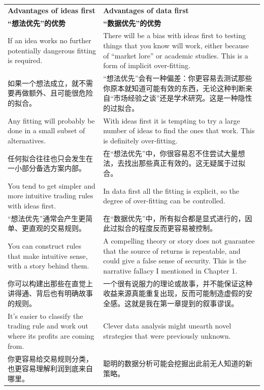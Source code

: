 \begin{bilingualtableblock} \noindent\begin{center} \begin{tabularx}{\textwidth}{@{} Y Y@{}}
\toprule
\textbf{Advantages of ideas first} & \textbf{Advantages of data first} \\
\textbf{“想法优先”的优势} & \textbf{“数据优先”的优势} \\
\midrule
If an idea works no further potentially dangerous fitting is required. &There will be a bias with ideas first to testing things that you know will work, either because of ``market lore'' or academic studies. This is a form of implicit over-fitting. \\
如果一个想法成立，就不需要再做额外、且可能很危险的拟合。 &“想法优先”会有一种偏差：你更容易去测试那些你原本就知道可能有效的东西，无论这种判断来自“市场经验之谈”还是学术研究。这是一种隐性的过拟合。 \\
Any fitting will probably be done in a small subset of alternatives. &With ideas first it is tempting to try a large number of ideas to find the ones that work. This is definitely over-fitting. \\
任何拟合往往也只会发生在一小部分备选方案内部。 &在“想法优先”中，你很容易忍不住尝试大量想法，去找出那些真正有效的。这无疑属于过拟合。 \\
You tend to get simpler and more intuitive trading rules with ideas first. &In data first all the fitting is explicit, so the degree of over-fitting can be controlled. \\
“想法优先”通常会产生更简单、更直观的交易规则。 &在“数据优先”中，所有拟合都是显式进行的，因此过拟合的程度反而更容易被控制。 \\
You can construct rules that make intuitive sense, with a story behind them. &A compelling theory or story does not guarantee that the source of returns is repeatable, and could give a false sense of security. This is the narrative fallacy I mentioned in Chapter 1. \\
你可以构建出那些在直觉上讲得通、背后也有明确故事的规则。 &一个很有说服力的理论或故事，并不能保证这种收益来源真能重复出现，反而可能制造虚假的安全感。这就是我在第一章提到的叙事谬误。 \\
It's easier to classify the trading rule and work out where its profits are coming from. &Clever data analysis might unearth novel strategies that were previously unknown. \\
你更容易给交易规则分类，也更容易理解利润到底来自哪里。 &聪明的数据分析可能会挖掘出此前无人知道的新策略。 \\
\bottomrule
\end{tabularx}
\end{center}
\end{bilingualtableblock}

